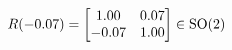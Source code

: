 \documentclass[preview]{standalone}
\begin{document}
\begin{align*}
\special{dvisvgm:raw <g id='unique000'>}R(-0.07) = \begin{bmatrix} 1.00 & 0.07 \\ -0.07 & 1.00 \end{bmatrix} \in \text{SO}(2)\special{dvisvgm:raw </g>}
\end{align*}
\end{document}
